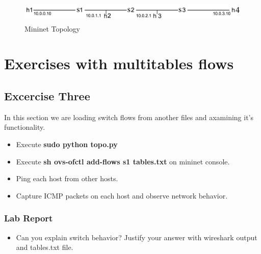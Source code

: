 \documentclass[10pt,a4paper]{article}
\numberwithin{equation}{section}
\numberwithin{figure}{section}
\numberwithin{table}{section}
\begin{document}
\begin{figure}[H]
	\centering
	\includegraphics[height=30pt]{img/fig2.png}
	\caption{Mininet Topology}
	\label{fig:linearRouters}
\end{figure}


\section{Exercises with multitables flows}
\subsection*{Excercise Three}
In this section we are loading switch flows from another files and axamining it's functionality.

\begin{itemize}
	\setlength{\itemindent}{10pt}
	\item Execute \textbf{sudo python topo.py} 
	\item Execute \textbf{sh ovs-ofctl add-flows s1 tables.txt} on mininet console.
	\item Ping each host from other hosts.
	\item Capture ICMP packets on each host and observe network behavior.
\end{itemize}

\subsubsection*{ Lab Report}
\begin{itemize}
	\setlength{\itemindent}{0pt}
	\item Can you explain switch behavior? Justify your answer with wireshark output and tables.txt file.
\end{itemize}
\end{document}
